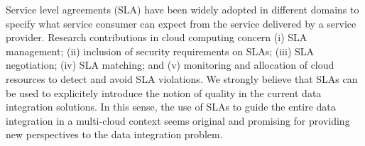 Service level agreements (SLA) have been widely adopted in different domains to specify what service consumer can expect from the service delivered by a service provider. Research contributions in cloud computing concern (i) SLA management; (ii) inclusion of security requirements on SLAs; (iii) SLA negotiation; (iv) SLA matching; and (v) monitoring and allocation of cloud resources to detect and avoid SLA violations. 
We strongly believe that SLAs can be used  to explicitely introduce the notion of quality in the current data integration solutions. In this sense, the use of SLAs to guide the entire data integration in a multi-cloud context seems original and promising for providing new perspectives to the data integration problem.
